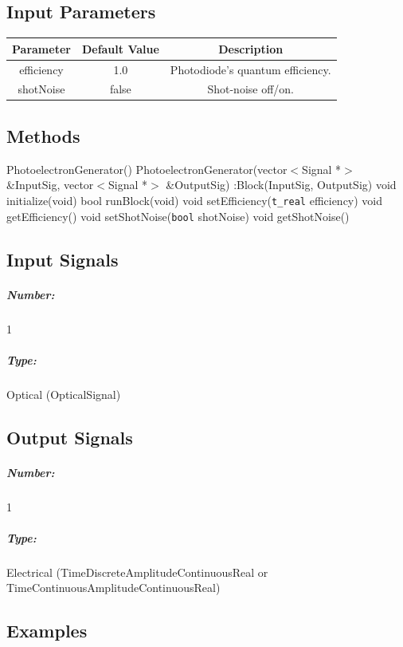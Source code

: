 \subsection*{Input Parameters}

\begin{table}[H]
	\centering
	\label{my-label}
	\begin{tabular}{|c|c|c|}
		\hline
		\textbf{Parameter}	& \textbf{Default Value}	& \textbf{Description} \\
		\hline
		efficiency			& 1.0						& Photodiode's quantum efficiency. \\
		\hline
		shotNoise			& false 					& Shot-noise off/on. \\
		\hline
	\end{tabular}
\end{table}




\subsection*{Methods}

PhotoelectronGenerator()
\bigbreak
PhotoelectronGenerator(vector$<$Signal *$>$ \&InputSig, vector$<$Signal *$>$ \&OutputSig) :Block(InputSig, OutputSig) {}
\bigbreak
void initialize(void)
\bigbreak
bool runBlock(void)
\bigbreak
void setEfficiency(\texttt{t\_real} efficiency)
\bigbreak
void getEfficiency()
\bigbreak
void setShotNoise(\texttt{bool} shotNoise)
\bigbreak
void getShotNoise()
%
%
%
%
\pagebreak

\subsection*{Input Signals}

\subparagraph*{Number:} 1

\subparagraph*{Type:} Optical (OpticalSignal)

\subsection*{Output Signals}

\subparagraph*{Number:} 1

\subparagraph*{Type:} Electrical (TimeDiscreteAmplitudeContinuousReal or TimeContinuousAmplitudeContinuousReal)

\subsection*{Examples}

